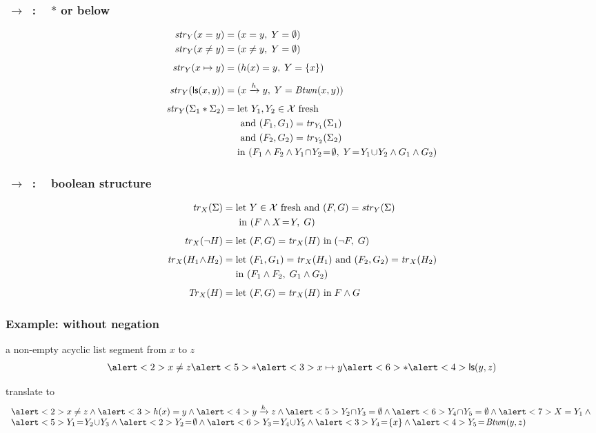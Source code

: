 \documentclass{beamer}
\begin{document}
\begin{frame}
  \frametitle{\JoshLogic $\ \rightarrow \ $ \LRJQ : ~ $*$ or below}
  \begin{align*}
    \str{Y}{x = y} = {} & (x = y,\; Y = \emptyset) \\
    \str{Y}{x \neq y} = {} & (x \neq y,\; Y = \emptyset) \\[1ex]
    \str{Y}{x \mapsto y} = {} & (\edge(x)=y,\; Y = \{x\})\\[1ex]
    \str{Y}{\ls(x,y)} = {} & (\reach{x}{y},\;  Y = \Btwn(x,y)) \\[1ex]
    \str{Y}{\Sigma_1 * \Sigma_2} = {} &
    \text{let } \text{$Y_1,Y_2 \in \vars$ fresh } \\
    & \text{ and } (F_1,G_1) = \tr_{Y_1}(\Sigma_1) \\
    & \text{ and } (F_2,G_2) = \tr_{Y_2}(\Sigma_2)\\
    & \text{in } (F_1 \land F_2 \land Y_1\!\cap\!Y_2\!=\!\emptyset,\;     Y\!=\!Y_1\!\cup\!Y_2 \land G_1 \land G_2)\\
  \end{align*}
\end{frame}

\begin{frame}
  \frametitle{\JoshLogic $\ \rightarrow \ $ \LRJQ : ~ boolean structure}
  \begin{align*}
    \tr_X(\Sigma) = {} & \text{let } \text{$Y \in \vars$ fresh and } (F,G) = \str{Y}{\Sigma} \\
    & \text{ in }(F \land X\!=\!Y,\; G)\\[1ex]
    \tr_X(\neg H) = {} &
    \letin{(F,G)}{\tr_{X}(H)} \; (\neg F,\; G)\\[1ex]
    \tr_X(H_1\!\land\!H_2) = {} &
    \text{let } (F_1,G_1) = \tr_X(H_1) \text{ and }
    (F_2,G_2) = \tr_X(H_2) \\
    & \text{in }(F_1 \land F_2,\; G_1 \land G_2)\\[1ex]
    \trfull{H}{X} = {} & \letin{(F,G)}{\tr_X(H)} \; F \land G
  \end{align*}%
\end{frame}

\begin{frame}
  \frametitle{Example: without negation}
a non-empty acyclic list segment from $x$ to $z$
\[ \alert<2>{x \neq z} \alert<5>{*} \alert<3>{x \mapsto y} \alert<6>{*} \alert<4>{\liste{y}{z}} \]

translate to
\[
\begin{array}{l}
\alert<2>{x \neq z} \land
\alert<3>{\edge(x)=y} \land
\alert<4>{\reach{y}{z}} \land
\alert<5>{Y_2\!\cap\!Y_3 = \emptyset} \land
\alert<6>{Y_4\!\cap\!Y_5 = \emptyset} \land
\alert<7>{X = Y_1} \land {} \\
\alert<5>{Y_1\!=\!Y_2\!\cup\!Y_3} \land
\alert<2>{Y_2\!=\!\emptyset} \land
\alert<6>{Y_3\!=\!Y_4\!\cup\!Y_5} \land %
\alert<3>{Y_4\!=\!\{x\}} \land
\alert<4>{Y_5\!=\!\Btwn(y,z)}
\end{array}
\]
\end{frame}
\end{document}

